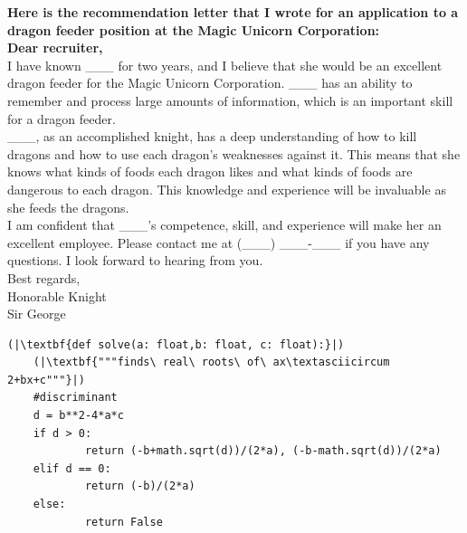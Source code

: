 \documentclass[11pt]{article}
\begin{document}
\begin{framed}
\centering
\vspace{.5em}
 \begin{minipage}{.9\textwidth}
\textbf{Here is the recommendation letter that I wrote for an application to a dragon feeder position at the Magic Unicorn Corporation:\\
Dear recruiter,}\\
I have known \_\_\_ for two years, and I believe that she would be an excellent dragon feeder for the Magic Unicorn Corporation. \_\_\_ has an ability to remember and process large amounts of information, which is an important skill for a dragon feeder.\\
\_\_\_, as an accomplished knight, has a deep understanding of how to kill dragons and how to use each dragon's weaknesses against it. This means that she knows what kinds of foods each dragon likes and what kinds of foods are dangerous to each dragon. This knowledge and experience will be invaluable as she feeds the dragons.\\
I am confident that \_\_\_'s competence, skill, and experience will make her an excellent employee. Please contact me at (\_\_\_) \_\_\_-\_\_\_ if you have any questions. I look forward to hearing from you.\\
Best regards,\\
Honorable Knight\\
Sir George
\end{minipage}
\vspace{.5em}
\end{framed}

\begin{framed}
\centering
\vspace{.5em}
 \begin{minipage}{.9\textwidth}
\begin{lstlisting}
(|\textbf{def solve(a: float,b: float, c: float):}|)
    (|\textbf{"""finds\ real\ roots\ of\ ax\textasciicircum 2+bx+c"""}|)
    #discriminant
    d = b**2-4*a*c
    if d > 0:
            return (-b+math.sqrt(d))/(2*a), (-b-math.sqrt(d))/(2*a)
    elif d == 0:
            return (-b)/(2*a)
    else:
            return False
\end{lstlisting}
\end{minipage}
\vspace{.5em}
\end{framed}
\end{document}
